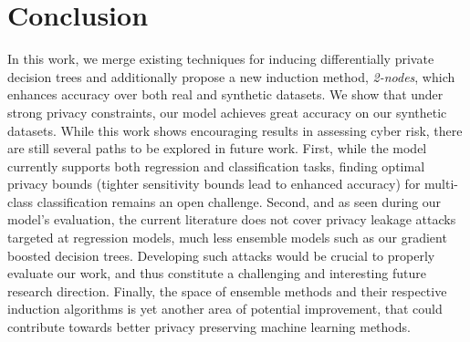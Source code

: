 \chapter{Conclusion}

In this work, we merge existing techniques for inducing differentially private decision trees and additionally propose a new induction method, \textit{2-nodes}, which enhances accuracy over both real and synthetic datasets. We show that under strong privacy constraints, our model achieves great accuracy on our synthetic datasets. While this work shows encouraging results in assessing cyber risk, there are still several paths to be explored in future work. First, while the model currently supports both regression and classification tasks, finding optimal privacy bounds (tighter sensitivity bounds lead to enhanced accuracy) for multi-class classification remains an open challenge. Second, and as seen during our model's evaluation, the current literature does not cover privacy leakage attacks targeted at regression models, much less ensemble models such as our gradient boosted decision trees. Developing such attacks would be crucial to properly evaluate our work, and thus constitute a challenging and interesting future research direction. Finally, the space of ensemble methods and their respective induction algorithms is yet another area of potential improvement, that could contribute towards better privacy preserving machine learning methods.